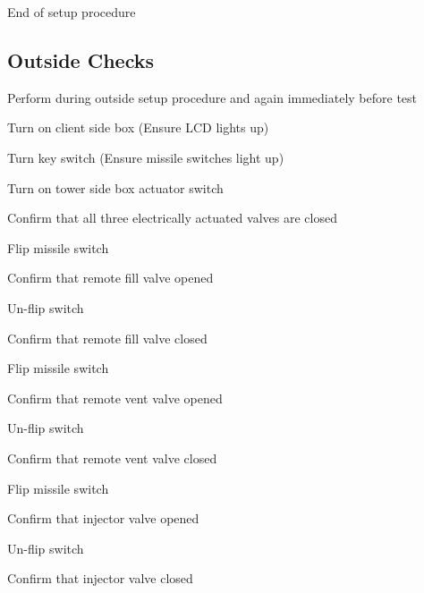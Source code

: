 End of setup procedure

\subsection{Outside Checks}
Perform during outside setup procedure and again immediately before test
\begin{checklist}
    \item Turn on client side box (Ensure LCD lights up)
    \item Turn key switch (Ensure missile switches light up)
    \item Turn on tower side box actuator switch
    \item Confirm that all three electrically actuated valves are closed
    \item Flip \rfill{} missile switch
    \begin{checklist}
        \item Confirm that remote fill valve opened
    \end{checklist}
    \item Un-flip \rfill{} switch
    \begin{checklist}
        \item Confirm that remote fill valve closed
    \end{checklist}

    \item Flip \rvent{} missile switch
    \begin{checklist}
        \item Confirm that remote vent valve opened
    \end{checklist}
    \item Un-flip \rvent{} switch
    \begin{checklist}
        \item Confirm that remote vent valve closed
    \end{checklist}

    \item Flip \inj{} missile switch
    \begin{checklist}
        \item Confirm that injector valve opened
    \end{checklist}
    \item Un-flip \inj{} switch
    \begin{checklist}
        \item Confirm that injector valve closed
    \end{checklist}
\end{checklist}
